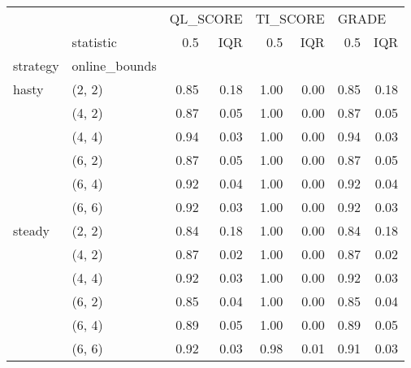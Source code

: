 \begin{tabular}{llrrrrrr}
\toprule
       & {} & \multicolumn{2}{l}{QL\_SCORE} & \multicolumn{2}{l}{TI\_SCORE} & \multicolumn{2}{l}{GRADE} \\
       & statistic &      0.5 &  IQR &      0.5 &  IQR &   0.5 &  IQR \\
strategy & online\_bounds &          &      &          &      &       &      \\
\midrule
hasty & (2, 2) &     0.85 & 0.18 &     1.00 & 0.00 &  0.85 & 0.18 \\
       & (4, 2) &     0.87 & 0.05 &     1.00 & 0.00 &  0.87 & 0.05 \\
       & (4, 4) &     0.94 & 0.03 &     1.00 & 0.00 &  0.94 & 0.03 \\
       & (6, 2) &     0.87 & 0.05 &     1.00 & 0.00 &  0.87 & 0.05 \\
       & (6, 4) &     0.92 & 0.04 &     1.00 & 0.00 &  0.92 & 0.04 \\
       & (6, 6) &     0.92 & 0.03 &     1.00 & 0.00 &  0.92 & 0.03 \\
steady & (2, 2) &     0.84 & 0.18 &     1.00 & 0.00 &  0.84 & 0.18 \\
       & (4, 2) &     0.87 & 0.02 &     1.00 & 0.00 &  0.87 & 0.02 \\
       & (4, 4) &     0.92 & 0.03 &     1.00 & 0.00 &  0.92 & 0.03 \\
       & (6, 2) &     0.85 & 0.04 &     1.00 & 0.00 &  0.85 & 0.04 \\
       & (6, 4) &     0.89 & 0.05 &     1.00 & 0.00 &  0.89 & 0.05 \\
       & (6, 6) &     0.92 & 0.03 &     0.98 & 0.01 &  0.91 & 0.03 \\
\bottomrule
\end{tabular}
